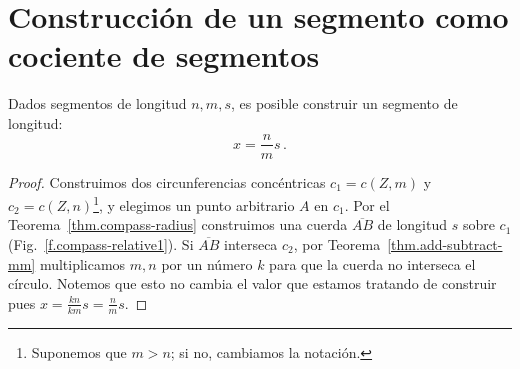 
\section[Un segmento como cociente de segmentos]
{Construcción de un segmento como cociente de segmentos}\label{s.three}

\begin{theorem}\label{thm.compass-ratio}
Dados segmentos de longitud $n,m,s$, es posible construir un segmento de longitud:
\[
x = \frac{n}{m}s\,.
\]
\end{theorem}

\begin{proof}
Construimos dos circunferencias concéntricas $c_1 = c(Z,m)$ y $c_2 = c(Z,n)$\footnote{Suponemos que $m>n$; si no, cambiamos la notación.}, y elegimos un punto arbitrario $A$ en $c_1$. Por el Teorema~\ref{thm.compass-radius} construimos una cuerda $\overline{AB}$ de longitud $s$ sobre $c_1$ (Fig.~\ref{f.compass-relative1}). Si $\overline{AB}$ interseca $c_2$, por Teorema~\ref{thm.add-subtract-mm} multiplicamos $m,n$ por un número $k$ para que la cuerda no interseca el círculo. Notemos que esto no cambia el valor que estamos tratando de construir pues $x=\displaystyle\frac{kn}{km}s=\displaystyle\frac{n}{m}s$.


\end{proof}
